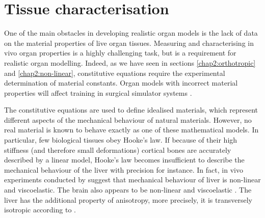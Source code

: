 
			
\section{Tissue characterisation}
One of the main obstacles in developing realistic organ models is the lack of data on the material properties of live organ tissues. Measuring and characterising in vivo organ properties is a highly challenging task, but is a requirement for realistic organ modelling. Indeed, as we have seen in sections \ref{chap2:orthotropic} and \ref{chap2:non-linear}, constitutive equations require the experimental determination of material constants. Organ models with incorrect material properties will affect training in surgical simulator systems \citep{Sedef06}.

The constitutive equations are used to define idealised materials, which represent different aspects of the mechanical behaviour of natural materials. However, no real material is known to behave exactly as one of these mathematical models. In particular, few biological tissues obey Hooke's law. If because of their high stiffness (and therefore small deformations) cortical bones are accurately described by a linear model, Hooke's law becomes insufficient to describe the mechanical behaviour of the liver with precision for instance. In fact, in vivo experiments conducted by \cite{Melvin73} suggest that mechanical behaviour of liver is non-linear and viscoelastic. The brain also appears to be non-linear and viscoelastic \citep{Miller97}. The liver has the additional property of anisotropy, more precisely, it is transversely isotropic according to \cite{Chui07}. 






